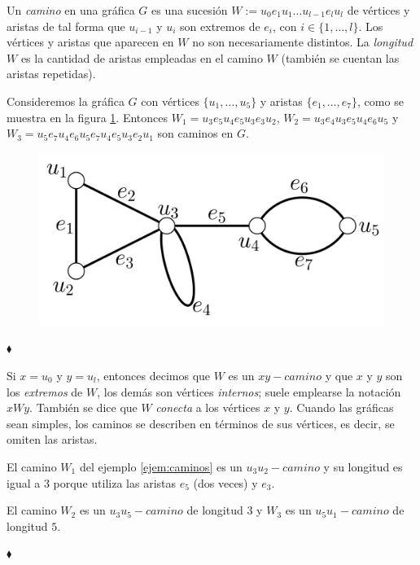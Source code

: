 Un \textit{camino}  en una gráfica $G$ es una sucesión $W:= u_{0}e_{1}u_{1}\ldots u_{l-1}e_{l}u_{l}$ de vértices y aristas de tal forma que $u_{i-1}$ y $u_{i}$ son extremos de $e_{i}$, con $i\in\{1, \ldots, l\}$. Los vértices y aristas que aparecen en $W$ no son necesariamente distintos. La \textit{longitud}  $W$ es la cantidad de aristas empleadas en el camino $W$ (también se cuentan las aristas repetidas).


\begin{ejem} \label{ejem:caminos}
Consideremos la gráfica $G$ con vértices $\{u_{1}, \ldots, u_{5}\}$ y aristas $\{e_{1}, \ldots, e_{7}\}$, como se muestra en la figura \ref{fig:GrafoCaminos}.
Entonces $W_{1}=u_{3}e_{5}u_{4}e_{5}u_{3}e_{3}u_{2}$, $W_{2}=u_{3}e_{4}u_{3}e_{5}u_{4}e_{6}u_{5}$ y $W_{3}=u_{5}e_{7}u_{4}e_{6}u_{5}e_{7}u_{4}e_{5}u_{3}e_{2}u_{1}$ son caminos en $G$. 

\begin{figure}[H]
    \centering
    \includegraphics[scale=0.3]{img/imgchapter1/GrafoCaminos.jpg}
    \caption{}
    \label{fig:GrafoCaminos}
\end{figure}

\hfill $\blacklozenge$
\end{ejem}


Si $x = u_{0}$ y $y = u_{l}$, entonces decimos que $W$ es un $xy-camino$ y que $x$ y $y$ son los \textit{extremos} de $W$, los demás son vértices \textit{internos}; suele emplearse la notación $xWy$. También se dice que $W$ \textit{conecta} a los vértices $x$ y $y$. Cuando las gráficas sean simples, los caminos se describen en términos de sus vértices, es decir, se omiten las aristas.


\begin{ejem}
El camino $W_{1}$ del ejemplo \ref{ejem:caminos} es un $u_{3}u_{2}-camino$ y su longitud es igual a $3$ porque utiliza las aristas $e_{5}$ (dos veces) y $e_{3}$.

El camino $W_{2}$ es un $u_{3}u_{5}-camino$ de longitud $3$ y $W_{3}$ es un $u_{5}u_{1}-camino$ de longitud $5$.


\hfill $\blacklozenge$
\end{ejem}


